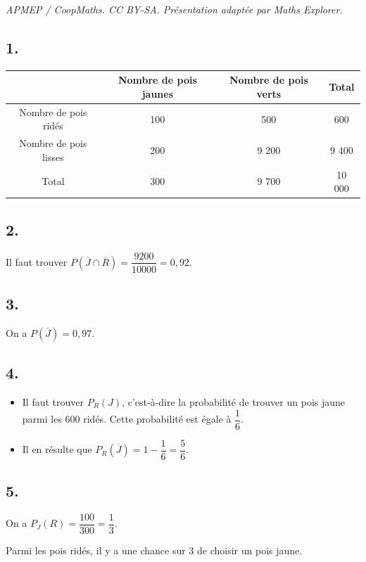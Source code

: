 \documentclass[10pt]{article}
\begin{document}
\noindent\textit{APMEP / CoopMaths. CC BY-SA. Présentation adaptée par Maths Explorer.}\par\medskip
\subsection*{1.}

\begin{center}
\begin{tabular}{|c|c|c|c|}
\hline
 & Nombre de pois jaunes & Nombre de pois verts & Total \\ \hline
Nombre de pois ridés  & 100  & 500  & 600   \\ \hline
Nombre de pois lisses & 200  & 9 200 & 9 400 \\ \hline
Total                 & 300  & 9 700 & 10 000 \\ \hline
\end{tabular}
\end{center}

\subsection*{2.}

Il faut trouver \(P(\overline{J} \cap \overline{R}) = \dfrac{9200}{10000} = 0,92\).

\subsection*{3.}

On a \(P(\overline{J}) = 0,97\).

\subsection*{4.}

\begin{itemize}
    \item Il faut trouver \(P_R(J)\), c'est-à-dire la probabilité de trouver un pois jaune parmi les 600 ridés. Cette probabilité est égale à \(\dfrac{1}{6}\).
    \item Il en résulte que \(P_R(\overline{J}) = 1 - \dfrac{1}{6} = \dfrac{5}{6}\).
\end{itemize}

\subsection*{5.}

On a \(P_J(R) = \dfrac{100}{300} = \dfrac{1}{3}\).

Parmi les pois ridés, il y a une chance sur 3 de choisir un pois jaune.
\end{document}
